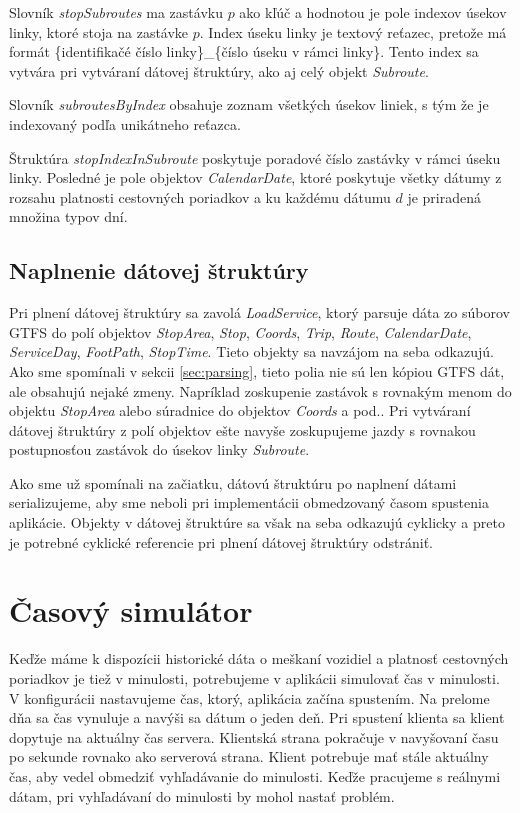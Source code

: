 Slovník \textit{stopSubroutes} ma zastávku $p$ ako kľúč a hodnotou je pole indexov úsekov linky, ktoré stoja na zastávke $p$. Index úseku linky je textový reťazec, pretože má formát \{identifikačé číslo linky\}\_\{číslo úseku v rámci linky\}. Tento index sa vytvára pri vytváraní dátovej štruktúry, ako aj celý objekt \textit{Subroute}. 

Slovník \textit{subroutesByIndex} obsahuje zoznam všetkých úsekov liniek, s tým že je indexovaný podľa unikátneho reťazca.

Štruktúra \textit{stopIndexInSubroute} poskytuje poradové číslo zastávky v rámci úseku linky. Posledné je pole objektov \textit{CalendarDate}, ktoré poskytuje  všetky dátumy z rozsahu platnosti cestovných poriadkov a ku každému dátumu $d$ je priradená množina typov dní. 

\subsection{Naplnenie dátovej štruktúry}
Pri plnení dátovej štruktúry sa zavolá \textit{LoadService}, ktorý parsuje dáta zo súborov GTFS do polí objektov \textit{StopArea}, \textit{Stop}, \textit{Coords}, \textit{Trip}, \textit{Route}, \textit{CalendarDate}, \textit{ServiceDay}, \textit{FootPath}, \textit{StopTime}. Tieto objekty sa navzájom na seba odkazujú. Ako sme spomínali v sekcii \ref{sec:parsing}, tieto polia nie sú len kópiou GTFS dát, ale obsahujú nejaké zmeny. Napríklad zoskupenie zastávok s rovnakým menom do objektu \textit{StopArea} alebo súradnice do objektov \textit{Coords} a pod.. Pri vytváraní dátovej štruktúry z polí objektov ešte navyše zoskupujeme jazdy s rovnakou postupnosťou zastávok do úsekov linky \textit{Subroute}. 

Ako sme už spomínali na začiatku, dátovú štruktúru po naplnení dátami serializujeme, aby sme neboli pri implementácii obmedzovaný časom spustenia aplikácie. Objekty v dátovej štruktúre sa však na seba odkazujú cyklicky a preto je potrebné cyklické referencie pri plnení dátovej štruktúry odstrániť. 

\section{Časový simulátor}
Keďže máme k dispozícii historické dáta o meškaní vozidiel a platnosť cestovných poriadkov je tiež v minulosti, potrebujeme v aplikácii simulovať čas v minulosti. V konfigurácii nastavujeme čas, ktorý, aplikácia začína spustením. Na prelome dňa sa čas vynuluje a navýši sa dátum o jeden deň. 
Pri spustení klienta sa klient dopytuje na aktuálny čas servera. Klientská strana pokračuje v navyšovaní času po sekunde rovnako ako serverová strana. Klient potrebuje mať stále aktuálny čas, aby vedel obmedziť vyhľadávanie do minulosti. Keďže pracujeme s reálnymi dátam, pri vyhľadávaní do minulosti by mohol nastať problém. 

